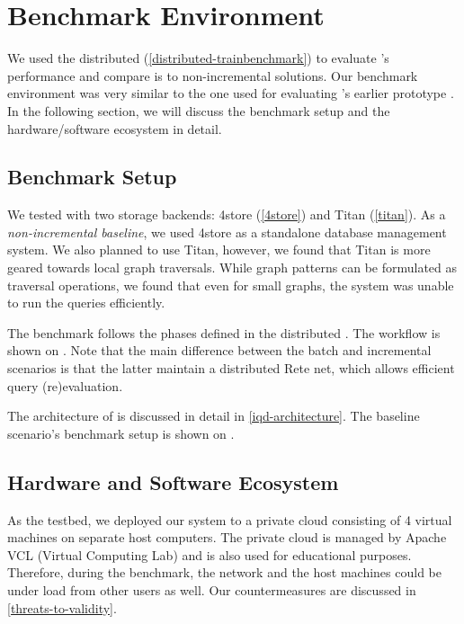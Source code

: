 \section{Benchmark Environment}
\label{sec:benchmark-environment}

We used the distributed \tb{} (\autoref{distributed-trainbenchmark}) to evaluate \iqd{}'s performance and compare is to non-incremental solutions. Our benchmark environment was very similar to the one used for evaluating \iqd{}'s earlier prototype \cite{Izso:2013:IIG:2487766.2487772}. In the following section, we will discuss the benchmark setup and the hardware/software ecosystem in detail.

\subsection{Benchmark Setup}

We tested \iqd{} with two storage backends: 4store (\autoref{4store}) and Titan (\autoref{titan}). As a \emph{non-incremental baseline}, we used 4store as a standalone database management system. We also planned to use Titan, however, we found that Titan is more geared towards local graph traversals. While graph patterns can be formulated as traversal operations, we found that even for small graphs, the system was unable to run the queries efficiently.


The benchmark follows the phases defined in the distributed \tb{}. The workflow is shown on . Note that the main difference between the batch and incremental scenarios is that the latter maintain a distributed Rete net, which allows efficient query (re)evaluation.   

The architecture of \iqd{} is discussed in detail in \autoref{iqd-architecture}. The baseline scenario's benchmark setup is shown on .


\subsection{Hardware and Software Ecosystem}
\label{ecosystem}

As the testbed, we deployed our system to a private cloud consisting of 4 virtual machines on separate host computers. The private cloud is managed by Apache VCL (Virtual Computing Lab) and is also used for educational purposes. Therefore, during the benchmark, the network and the host machines could be under load from other users as well. Our countermeasures are discussed in \autoref{threats-to-validity}.

